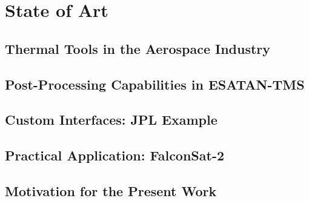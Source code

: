 \chapter{State of Art} \label{ch:chapter_03}
\section{Thermal Tools in the Aerospace Industry}
\section{Post-Processing Capabilities in ESATAN-TMS}
\section{Custom Interfaces: JPL Example}
\section{Practical Application: FalconSat-2}
\section{Motivation for the Present Work}